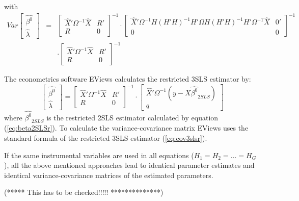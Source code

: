 with
\begin{eqnarray}
   Var 
   \left[ \begin{array}{c}
      \widehat{\beta^0} \\ \widehat{\lambda}
   \end{array} \right] 
   & = & 
   \left[ \begin{array}{cc}
      \widehat{X}' \Omega^{-1} \widehat{X} & R' \\ 
      R & 0
   \end{array} \right]^{-1}
   \cdot
   \left[ \begin{array}{cc}
      \widehat{X}' \Omega^{-1} H \left( H' H \right)^{-1} H' \Omega
      H \left( H' H \right)^{-1} H' \Omega^{-1} \widehat{X} & 0' \\ 
      0 & 0
   \end{array} \right]^{-1}
   \nonumber \\
   & & \cdot
   \left[ \begin{array}{cc}
      \widehat{X}' \Omega^{-1} \widehat{X} & R' \\ 
      R & 0
   \end{array} \right]^{-1}
\end{eqnarray}


The econometrics software EViews calculates the restricted 3SLS estimator by:
\begin{equation}
   \left[ \begin{array}{c}
      \widehat{\beta^0} \\ \widehat{\lambda}
   \end{array} \right]
   =
   \left[ \begin{array}{cc}
      \widehat{X}' \Omega^{-1} \widehat{X} & R' \\ 
      R & 0
   \end{array} \right]^{-1}
   \cdot
   \left[ \begin{array}{c}
      \widehat{X}' \Omega^{-1} \left( y - X \widehat{\beta^0}_{2SLS} \right) 
      \\ q 
   \end{array} \right]
\end{equation}
where $\widehat{\beta^0}_{2SLS}$ is the restricted 2SLS estimator calculated
by equation (\ref{eq:beta2SLSr}). 
To calculate the variance-covariance matrix 
EViews uses the standard formula of the restricted 3SLS estimator
(\ref{eq:cov3slsr}).


If the same instrumental variables are used in all equations 
($H_1 = H_2 = \ldots = H_G$), 
all the above mentioned approaches lead to identical parameter estimates
and identical variance-covariance matrices of the estimated parameters.

(***** This has to be checked!!!!! **************)


